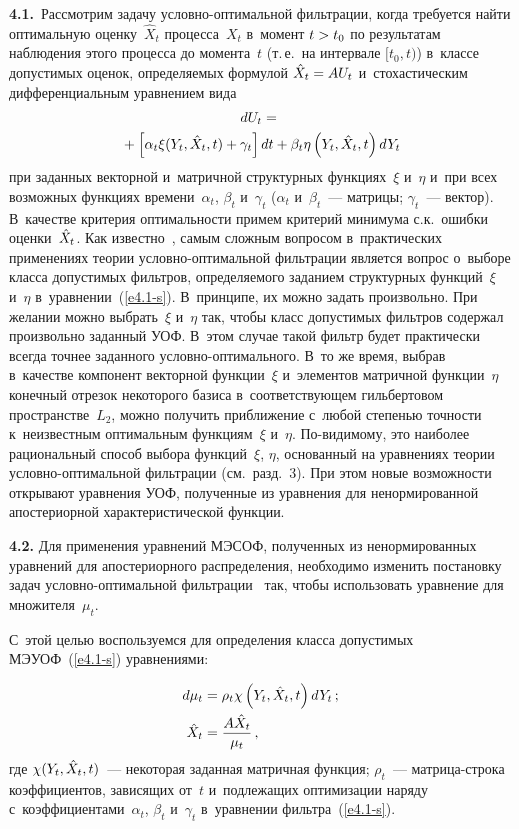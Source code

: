 \begin{multicols}{2}
\textbf{4.1.}\ Рассмотрим задачу услов\-но-оп\-ти\-маль\-ной фильтрации, когда 
требуется найти оптимальную оценку~$\hat X_t$  процесса~$X_t$ в~момент  $t\hm>t_0$ 
по результатам наблюдения этого процесса до момента~$t$ (т.\,е.\ на интервале
$[t_0,t)$) в~классе допустимых оценок, определяемых формулой $\hat X_t \hm= A U_t$ 
и~стохастическим дифференциальным уравнением вида
  \begin{multline}
  dU_t ={}\\
  {}+\left[ \alpha_t\xi (Y_t,{\hat X_t},t)+\gamma_t \right] dt +\beta_t\eta \left(Y_t,{\hat X_t},t\right)
    dY_t\label{e4.1-s}
    \end{multline}
при заданных векторной и~матричной структурных функциях~$\xi$
и~$\eta$ и~при всех возможных функциях времени~$\alpha_t$, $\beta_t$
и~$\gamma_t$ ($\alpha_t$ и~$\beta_t$~--- матрицы; $\gamma_t$~---
вектор). В~качестве критерия
оптимальности примем критерий минимума с.к.\ ошибки
оценки~${\hat X_t}$.
Как известно~\cite{6-s}, самым сложным вопросом в~практических
применениях теории услов\-но-оп\-ти\-маль\-ной фильт\-ра\-ции является вопрос
о~выборе класса до\-пус\-ти\-мых фильтров, опре\-де\-ля\-емо\-го заданием
структурных функций~$\xi$ и~$\eta$ в~уравнении~(\ref{e4.1-s}). 
В~принципе, их можно задать произвольно. При желании можно выбрать~$\xi$ 
и~$\eta$ так, чтобы класс допустимых фильтров содержал
произвольно заданный УОФ. В~этом случае
такой фильтр будет практически всегда точнее заданного
услов\-но-оп\-ти\-маль\-но\-го. В~то же время, выбрав в~качестве компонент
векторной функции~$\xi$ и~элементов матричной функции~$\eta$
конечный отрезок некоторого базиса в~соответствующем гильбертовом
пространстве~$L_2$, можно получить приближение с~любой степенью
точ\-ности к~неизвестным оптимальным функциям~$\xi$ и~$\eta$.
По-ви\-ди\-мо\-му, это наиболее рациональный способ выбора функций~$\xi$, $\eta$, 
основанный на уравнениях теории услов\-но-оп\-ти\-маль\-ной
фильтрации (см.\ разд.~3). При этом новые возможности
открывают уравнения УОФ, полученные из
уравнения для ненормированной апостериорной характеристической функции.

\textbf{4.2.} Для применения уравнений МЭСОФ, полученных из ненормированных
уравнений для апостериорного распределения, необходимо изменить
постановку задач услов\-но-оп\-ти\-маль\-ной фильтрации~\cite{6-s} так,
чтобы использовать уравнение для множителя~$\mu_t $.

С~этой целью воспользуемся для определения класса допустимых
МЭУОФ~(\ref{e4.1-s}) уравнениями:

\noindent
\begin{align}
d\mu_t &=\rho_t \chi \left(Y_t,\hXt,t\right) d Y_t\,;\label{e4.2-s}\\
    \hat X_t &= \fr{A \hXt }{\mu_t}\,,\notag %
    \end{align}
где $\chi (Y_t,{\hat X_t},t)$~--- некоторая заданная матричная функция;
$\rho_t$~--- мат\-ри\-ца-стро\-ка коэффициентов, зависящих  
от~$t$ и~подлежащих оптимизации наряду с~коэффициентами~$\alpha_t$,
$\beta_t$ и~$\gamma_t$ в~уравнении фильт\-ра~(\ref{e4.1-s}).


\end{multicols}
